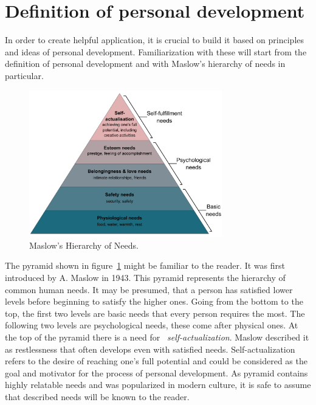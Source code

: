 
\section{Definition of personal development}\label{sec:definition-of-personal-development}

In order to create helpful application, it is crucial to build it based on principles and ideas of personal development.
Familiarization with these will start from the definition of personal development and with Maslow's hierarchy of needs in particular.

\begin{figure}[h]
    \includegraphics[width=0.75\textwidth]{images/maslows.png}
    \caption{Maslow's Hierarchy of Needs.\cite{maslow-pyramid}}
    \label{fig:maslow-pyramid}
\end{figure}

The pyramid shown in figure~\ref{fig:maslow-pyramid} might be familiar to the reader.
It was first introduced by A. Maslow in 1943.\cite{maslow-motivation}
This pyramid represents the hierarchy of common human needs.
It may be presumed, that a person has satisfied lower levels before beginning to satisfy the higher ones.
Going from the bottom to the top, the first two levels are basic needs that every person requires the most.
The following two levels are psychological needs, these come after physical ones.
At the top of the pyramid there is a need for ~\textit{self-actualization}.
Maslow described it as restlessness that often develops even with satisfied needs.
Self-actualization refers to the desire of reaching one's full potential and could be considered as the goal and motivator for the process of personal development.
As pyramid contains highly relatable needs and was popularized in modern culture, it is safe to assume that described needs will be known to the reader.

